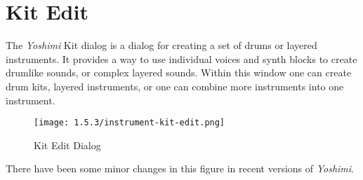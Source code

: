 %
%
%

\section{Kit Edit}
\label{sec:kit_edit}

   The \textsl{Yoshimi} Kit dialog is a dialog for creating a
   set of drums or layered instruments.
   It provides a way to use individual voices and synth blocks to create
   drumlike sounds, or complex layered sounds.
   Within this window one can create drum kits, layered instruments, or one
   can combine more instruments into one instrument.  


\begin{figure}[H]
   \centering 
   \texttt{[image: 1.5.3/instrument-kit-edit.png]}
   \caption{Kit Edit Dialog}
   \label{fig:kit_edit_dialog}
\end{figure}

   There have been some minor changes in
   this figure in recent versions of \textsl{Yoshimi}.

